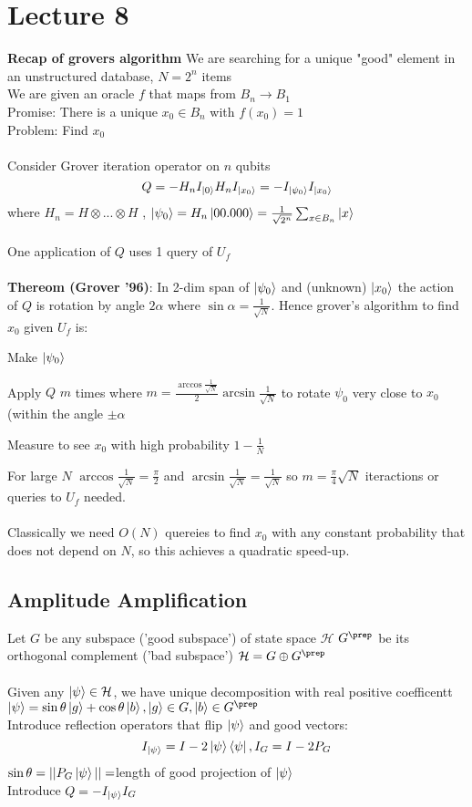 \documentclass{article}
\begin{document}
\section{Lecture 8}
\textbf{Recap of grovers algorithm}
We are searching for a unique "good" element in an unstructured database, $N= 2^n$ items\\
We are given an oracle $f$ that maps from $B_n \rightarrow B_1$\\
Promise: There is a unique $x_0 \in B_n$ with $f(x_0) = 1$\\
Problem: Find $x_0$\\\\
Consider Grover iteration operator on $n$ qubits
$$
Q = - H_n I_{\ket{0}} H_n I_{\ket{x_0}} = - I_{\ket{\psi_0}} I_{\ket{x_0}}
$$
where $H_n = H\otimes ... \otimes H$ , $\ket{\psi_0} = H_n \ket{00.000} = \frac{1}{\sqrt{2^n}} \sum_{x \in B_n} \ket{x}$\\\\
One application of $Q$ uses 1 query of $U_f$\\\\
\textbf{Thereom (Grover '96)}: In 2-dim span of $\ket{\psi_0}$ and (unknown) $\ket{x_0}$ the action of $Q$ is rotation by angle $2 \alpha$ where $\sin \alpha = \frac{1}{\sqrt{N}}$. Hence grover's algorithm to find $x_0$ given $U_f$ is:
\begin{itemlist}
\item Make $\ket{\psi_0}$\\
\item Apply $Q$ $m$ times where $m = \frac{\arccos \frac{1}{\sqrt{N}}}{2} \arcsin \frac{1}{\sqrt{N}}$ to rotate $\psi_0$ very close to $x_0$ (within the angle $\pm \alpha$\\
\item Measure to see $x_0$ with high probability $1- \frac{1}{N}$
\end{itemlist}
For large $N$ $\arccos \frac{1}{\sqrt{N}} = \frac{\pi}{2}$ and $\arcsin \frac{1}{\sqrt{N}} = \frac{1}{\sqrt{N}}$ so $m = \frac{\pi}{4} \sqrt{N}$ iteractions or queries to $U_f$ needed.\\\\
Classically we need $O(N)$ quereies to find $x_0$ with any constant probability that does not depend on $N$, so this achieves a quadratic speed-up.
\subsection{Amplitude Amplification}
Let $G$ be any subspace ('good subspace') of state space $\mathcal{H}$ $G^{\prep}$ be its orthogonal complement ('bad subspace') $\mathcal{H} = G \oplus G^{\prep}$\\\\
Given any $\ket{\psi} \in \mathcal{H}$, we have unique decomposition with real positive coefficentt $\ket{\psi} = \sin \theta \ket{g} + \cos \theta \ket{b}, \ket{g} \in G, \ket{b} \in G^{\prep}$\\
Introduce reflection operators that flip $\ket{\psi}$ and good vectors:
$$
I_{\ket{\psi}} = I - 2 \ket{\psi} \bra{\psi}, I_G = I - 2 P_G
$$
$\sin \theta  = ||P_G\ket{\psi}|| = $length of good projection of $\ket{\psi}$\\
Introduce $Q = -I_{\ket{\psi}} I_G$
\end{document}
